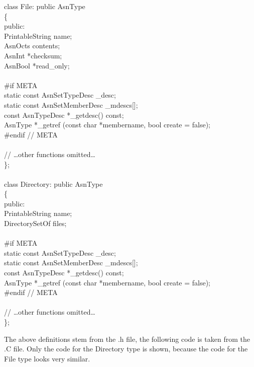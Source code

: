 \begin{Ccode}
class File: public AsnType\\
\{\\
public:\+\\
  PrintableString               \>\>name;\\
  AsnOcts               \>\>contents;\\
  AsnInt                \>\>*checksum;\\
  AsnBool               \>\>*read\_only;\\
\\
\<\#if META\\
  static const AsnSetTypeDesc   \>\>\_desc;\\
  static const AsnSetMemberDesc \>\>\_mdescs[];\\
  const AsnTypeDesc             \>\>*\_getdesc() const;\\
  AsnType                       \>\>*\_getref (const char *membername, bool create = false);\\
\<\#endif // META\\
\\
  // \dots other functions omitted\dots\-\\
\};\\
\\
class Directory: public AsnType\\
\{\\
public:\+\\
  PrintableString               \>\>name;\\
  DirectorySetOf                \>\>files;\\
\\
\<\#if META\\
  static const AsnSetTypeDesc   \>\>\_desc;\\
  static const AsnSetMemberDesc \>\>\_mdescs[];\\
  const AsnTypeDesc             \>\>*\_getdesc() const;\\
  AsnType                       \>\>*\_getref (const char *membername, bool create = false);\\
\<\#endif // META\\
\\
  // \dots other functions omitted\dots\\
\<\};
\end{Ccode}

The above definitions stem from the {\ufn .h} file, the following code is taken from the {\ufn .C} file.
Only the code for the {\ASN Directory} type is shown, because the code for the {\ASN File} type looks very similar.

